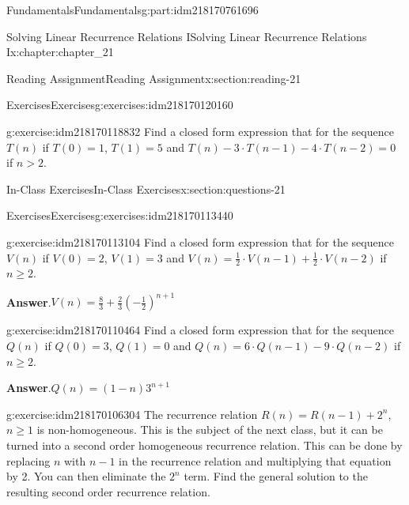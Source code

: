 \documentclass[oneside,10pt,]{book}
\newcommand{\blocktitlefont}{\relax}
\numberwithin{equation}{section}
\newcommand{\gt}{>}
\begin{document}
\begin{partptx}{Fundamentals}{}{Fundamentals}{}{}{g:part:idm218170761696}
\begin{chapterptx}{Solving Linear Recurrence Relations I}{}{Solving Linear Recurrence Relations I}{}{}{x:chapter:chapter_21}
\begin{sectionptx}{Reading Assignment}{}{Reading Assignment}{}{}{x:section:reading-21}
\begin{exercises-subsection-numberless}{Exercises}{}{Exercises}{}{}{g:exercises:idm218170120160}
\begin{exercisegroup}
\begin{divisionexerciseeg}{2}{}{}{g:exercise:idm218170118832}%
Find a closed form expression that for the sequence \(T(n)\) if  \(T(0)=1\), \(T(1)= 5\) and \(T(n)- 3\cdot T(n-1) -4 \cdot T(n-2)=0\) if \(n \gt 2\).%
\end{divisionexerciseeg}%
\end{exercisegroup}
\par\medskip\noindent
\end{exercises-subsection-numberless}
\end{sectionptx}
%
%
\typeout{************************************************}
\typeout{************************************************}
%
\begin{sectionptx}{In-Class Exercises}{}{In-Class Exercises}{}{}{x:section:questions-21}
%
%
%
\typeout{************************************************}
\typeout{************************************************}
%
\begin{exercises-subsection-numberless}{Exercises}{}{Exercises}{}{}{g:exercises:idm218170113440}
\par\medskip\noindent%
%
\begin{exercisegroup}
\begin{divisionexerciseeg}{1}{}{}{g:exercise:idm218170113104}%
Find a closed form expression that for the sequence \(V(n)\) if  \(V(0)=2\), \(V(1)= 3\) and \(V(n)= \frac{1}{2}\cdot V(n-1)+ \frac{1}{2}\cdot V(n-2)\) if \(n \geq 2\).%
\par\smallskip%
\noindent\textbf{\blocktitlefont Answer}.\hypertarget{g:answer:idm218170112560}{}\quad{}\(V(n)=\frac{8}{3}+\frac{2}{3} (-\frac{1}{2})^{n+1}\)%
\end{divisionexerciseeg}%
\begin{divisionexerciseeg}{2}{}{}{g:exercise:idm218170110464}%
Find a closed form expression that for the sequence \(Q(n)\) if  \(Q(0)=3\), \(Q(1)= 0\) and \(Q(n)=6\cdot Q(n-1)-9\cdot Q(n-2)\) if \(n \geq 2\).%
\par\smallskip%
\noindent\textbf{\blocktitlefont Answer}.\hypertarget{g:answer:idm218170109248}{}\quad{}\(Q(n)=(1-n)3^{n+1}\)%
\end{divisionexerciseeg}%
\begin{divisionexerciseeg}{3}{}{}{g:exercise:idm218170106304}%
The recurrence relation \(R(n)=R(n-1)+2^n\), \(n \geq 1\) is non-homogeneous.  This is the subject of the next class, but it can be turned into a second order homogeneous recurrence relation.  This can be done by replacing \(n\) with \(n-1\) in the recurrence relation and multiplying that equation by 2.   You can then eliminate the \(2^n\) term. Find the general solution to the resulting second order recurrence relation.%

\end{divisionexerciseeg}
\end{exercisegroup}
\end{exercises-subsection-numberless}
\end{sectionptx}
\end{chapterptx}
\end{partptx}
\end{document}
